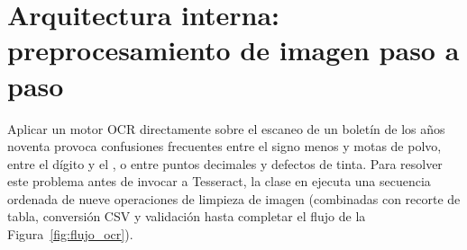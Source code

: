 \documentclass[12pt,letterpaper]{article}
\begin{document}
\section{Arquitectura interna: preprocesamiento de imagen paso a paso}

Aplicar un motor OCR directamente sobre el escaneo de un boletín de los años noventa provoca confusiones frecuentes entre el signo menos y motas de polvo, entre el dígito  y el , o entre puntos decimales y defectos de tinta. Para resolver este problema antes de invocar a Tesseract, la clase  en  ejecuta una secuencia ordenada de nueve operaciones de limpieza de imagen (combinadas con recorte de tabla, conversión CSV y validación hasta completar el flujo de la Figura~\ref{fig:flujo_ocr}).
\end{document}
